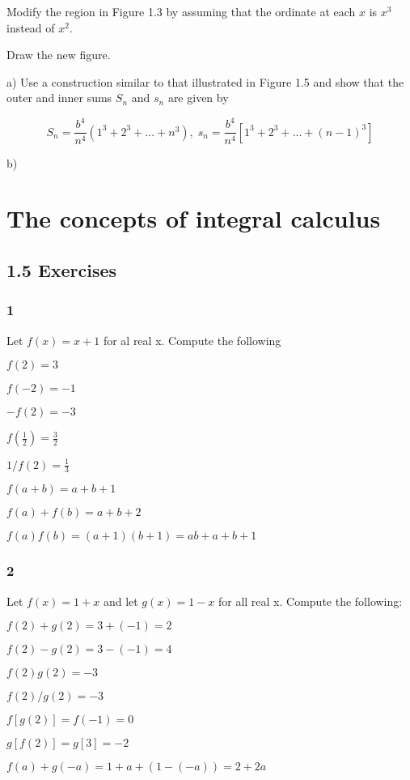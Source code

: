 \documentclass{report}
\begin{document}
Modify the region in Figure 1.3 by assuming that the ordinate at each $x$ is $x^3$ instead of $x^2$.

Draw the new figure.

a) Use a construction similar to that illustrated in Figure 1.5 and show that the outer and inner sums $S_n$ and $s_n$ are given by

\[
S_n = \frac{b^4}{n^4} (1^3 + 2^3 + ... + n^3), \; s_n = \frac{b^4}{n^4}[1^3 + 2^3 + ... + (n - 1)^3]
\]


b)

\section{The concepts of integral calculus}

\subsection{1.5 Exercises}

\subsubsection{1}

Let $f(x) = x + 1$ for al real x. Compute the following

$f(2) = 3$

$f(-2) = -1$

$-f(2) = -3$

$f(\frac{1}{2})= \frac{3}{2}$

$1/f(2) = \frac{1}{3}$

$f(a + b) = a + b + 1$

$f(a) + f(b) = a + b + 2$

$f(a)f(b) = (a+1)(b+1) = ab + a + b + 1$

\subsubsection{2}

Let $f(x) = 1 + x$ and let $g(x) = 1 - x$ for all real x. Compute the following:

$f(2) + g(2) = 3 + (-1) = 2$

$f(2) - g(2) = 3 - (-1) = 4$

$f(2)g(2) = -3$

$f(2)/g(2) = -3$

$f[g(2)] = f(-1) = 0$

$g[f(2)] = g[3] = -2$

$f(a) + g(-a) = 1 + a + (1 - (-a)) = 2 + 2a$
\end{document}
